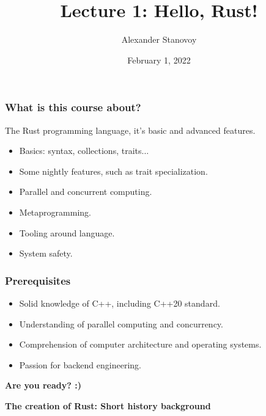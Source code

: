 \documentclass[aspectratio=1610,t]{beamer}
\title{Lecture 1: Hello, Rust!}
\date{February 1, 2022}
\author{Alexander Stanovoy}
\institute{alex.stanovoy@gmail.com}
\begin{document}

\begin{frame}
\maketitle
\end{frame}


\begin{frame}[c]
\frametitle{What is this course about?}
The Rust programming language, it's basic and advanced features.
\begin{itemize}
    \item Basics: syntax, collections, traits...
    \item Some nightly features, such as trait specialization.
    \item Parallel and concurrent computing.
    \item Metaprogramming.
    \item Tooling around language.
    \item System safety.
\end{itemize}
\end{frame}


\begin{frame}[c]
\frametitle{Prerequisites}
\begin{itemize}
    \item Solid knowledge of C++, including C++20 standard.
    \item Understanding of parallel computing and concurrency.
    \item Comprehension of computer architecture and operating systems.
    \item Passion for backend engineering.
\end{itemize}
\end{frame}

\begin{frame}[c]
\centering\Huge\textbf{Are you ready? :)}
\end{frame}


\begin{frame}[c]
\centering\Huge\textbf{The creation of Rust: Short history background}
\end{frame}
\end{document}
